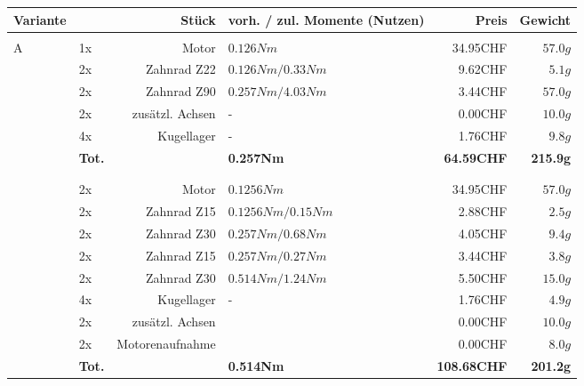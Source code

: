 \begin{table}[h!]
    \begin{tabular}{p{0.5cm}p{0.8cm}rp{3cm}rr}
    \textbf{Variante} & \multicolumn{2}{r}{\textbf{Stück}} & \textbf{vorh. / zul. Momente (Nutzen)} & \textbf{Preis} & \textbf{Gewicht} \\\hline
          &       &                 &                      &          &  \\
    \multirow{9}[2]{*}{A}
          & 1x    & Motor           & $0.126 Nm$           & 34.95CHF & $57.0 g$ \\
          & 2x    & Zahnrad Z22     & $0.126 Nm / 0.33 Nm$ &  9.62CHF & $5.1 g$  \\
          & 2x    & Zahnrad Z90     & $0.257 Nm / 4.03 Nm$ &  3.44CHF & $57.0 g$ \\
          & 2x    & zusätzl. Achsen & -                    &  0.00CHF & $10.0 g$ \\
          & 4x    & Kugellager      & -                    &  1.76CHF & $9.8 g$  \\
          & \textbf{Tot.} &  & \textbf{0.257Nm} & \textbf{64.59CHF} & \textbf{215.9g} \\
    \multirow{10}[2]{*}{B}
  	  &       &                 &                      &          &  \\
          &       &                 &                      &          &  \\
          & 2x    & Motor           & $0.1256 Nm$          & 34.95CHF & $57.0 g$ \\
          & 2x    & Zahnrad Z15     & $0.1256 Nm / 0.15 Nm$& 2.88CHF  & $2.5 g$  \\
          & 2x    & Zahnrad Z30     & $0.257 Nm / 0.68 Nm$ & 4.05CHF  & $9.4 g$  \\
          & 2x    & Zahnrad Z15     & $0.257 Nm / 0.27 Nm$ & 3.44CHF  & $3.8 g$  \\
          & 2x    & Zahnrad Z30     & $0.514 Nm / 1.24 Nm$ & 5.50CHF  & $15.0 g$ \\
          & 4x    & Kugellager      & -                    & 1.76CHF  & $4.9 g$  \\
          & 2x    & zusätzl. Achsen &                      & 0.00CHF  & $10.0 g$ \\
          & 2x    & Motorenaufnahme &                      & 0.00CHF  & $8.0 g$  \\
          & \textbf{Tot.} &       & \textbf{0.514Nm} & \textbf{108.68CHF} & \textbf{201.2g} \\

\end{tabular}
\end{table}
